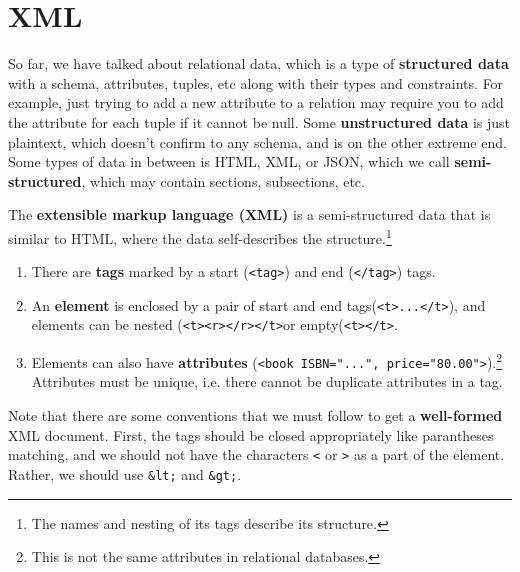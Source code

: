 \section{XML} 

  So far, we have talked about relational data, which is a type of \textbf{structured data} with a schema, attributes, tuples, etc along with their types and constraints. For example, just trying to add a new attribute to a relation may require you to add the attribute for each tuple if it cannot be null. Some \textbf{unstructured data} is just plaintext, which doesn't confirm to any schema, and is on the other extreme end. Some types of data in between is HTML, XML, or JSON, which we call \textbf{semi-structured}, which may contain sections, subsections, etc. 

  \begin{definition}[XML]
    The \textbf{extensible markup language (XML)} is a semi-structured data that is similar to HTML, where the data self-describes the structure.\footnote{The names and nesting of its tags describe its structure.} 
    \begin{enumerate}
      \item There are \textbf{tags} marked by a start (\texttt{<tag>}) and end (\texttt{</tag>}) tags. 
      \item An \textbf{element} is enclosed by a pair of start and end tags(\texttt{<t>...</t>}), and elements can be nested (\texttt{<t><r></r></t>}or empty(\texttt{<t></t>}.  
      \item Elements can also have \textbf{attributes} (\texttt{<book ISBN="...", price="80.00">}).\footnote{This is not the same attributes in relational databases.} Attributes must be unique, i.e. there cannot be duplicate attributes in a tag. 
    \end{enumerate}
    Note that there are some conventions that we must follow to get a \textbf{well-formed} XML document. First, the tags should be closed appropriately like parantheses matching, and we should not have the characters \texttt{<} or \texttt{>} as a part of the element. Rather, we should use \texttt{\&lt;} and \texttt{\&gt;}. 
  \end{definition}


